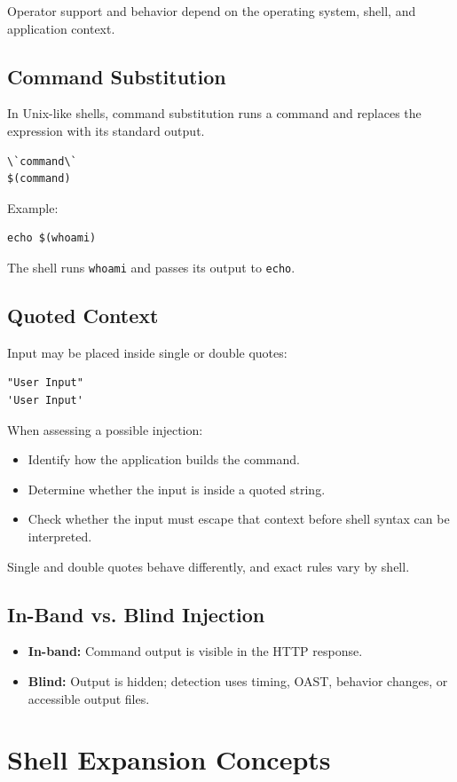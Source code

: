 \documentclass[12pt,a4paper]{article}
\newcommand{\nsection}[1]{\section{#1}}
\newcommand{\nsubsection}[1]{\subsection{#1}}
\begin{document}
Operator support and behavior depend on the operating system,
shell, and application context.

\vspace{0.5cm}
\nsubsection{Command Substitution}

In Unix-like shells, command substitution runs a command and
replaces the expression with its standard output.

\begin{lstlisting}
\`command\`
$(command)
\end{lstlisting}

Example:

\begin{lstlisting}
echo $(whoami)
\end{lstlisting}

The shell runs \texttt{whoami} and passes its output to
\texttt{echo}.

\newpage
\nsubsection{Quoted Context}

Input may be placed inside single or double quotes:

\begin{lstlisting}
"User Input"
'User Input'
\end{lstlisting}

When assessing a possible injection:

\begin{itemize}
    \item Identify how the application builds the command.
    \item Determine whether the input is inside a quoted string.
    \item Check whether the input must escape that context before
          shell syntax can be interpreted.
\end{itemize}

Single and double quotes behave differently, and exact rules
vary by shell.

\vspace{0.5cm}
\nsubsection{In-Band vs. Blind Injection}

\begin{itemize}
    \item \textbf{In-band:} Command output is visible in the HTTP response.
    \item \textbf{Blind:} Output is hidden; detection uses timing,
          OAST, behavior changes, or accessible output files.
\end{itemize}

\newpage
\nsection{Shell Expansion Concepts}
\end{document}
